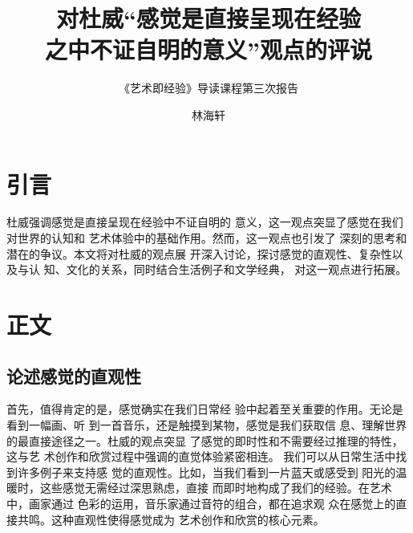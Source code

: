 \documentclass[10pt,a4paper]{beamer} %
\begin{document}
	
	\title{对杜威“感觉是直接呈现在经验\\之中不证自明的意义”观点的评说}
	\subtitle{《艺术即经验》导读课程第三次报告}
	\author{林海轩}
	\date{}
	
	\begin{frame}
		\titlepage
	\end{frame}
	
	\begin{frame}
		\tableofcontents
	\end{frame}
	
	\section{引言}
	\begin{frame}
		\quad\quad 杜威强调感觉是直接呈现在经验中不证自明的
		意义，这一观点突显了感觉在我们对世界的认知和
		艺术体验中的基础作用。然而，这一观点也引发了
		深刻的思考和潜在的争议。本文将对杜威的观点展
		开深入讨论，探讨感觉的直观性、复杂性以及与认
		知、文化的关系，同时结合生活例子和文学经典，
		对这一观点进行拓展。
	\end{frame}
	
	\section{正文}
		\subsection{论述感觉的直观性}
		\begin{frame}
			\quad\quad 首先，值得肯定的是，感觉确实在我们日常经
			验中起着至关重要的作用。无论是看到一幅画、听
			到一首音乐，还是触摸到某物，感觉是我们获取信
			息、理解世界的最直接途径之一。杜威的观点突显
			了感觉的即时性和不需要经过推理的特性，这与艺
			术创作和欣赏过程中强调的直觉体验紧密相连。
			我们可以从日常生活中找到许多例子来支持感
			觉的直观性。比如，当我们看到一片蓝天或感受到
			阳光的温暖时，这些感觉无需经过深思熟虑，直接
			而即时地构成了我们的经验。在艺术中，画家通过
			色彩的运用，音乐家通过音符的组合，都在追求观
			众在感觉上的直接共鸣。这种直观性使得感觉成为
			艺术创作和欣赏的核心元素。
		\end{frame}
\end{document}
